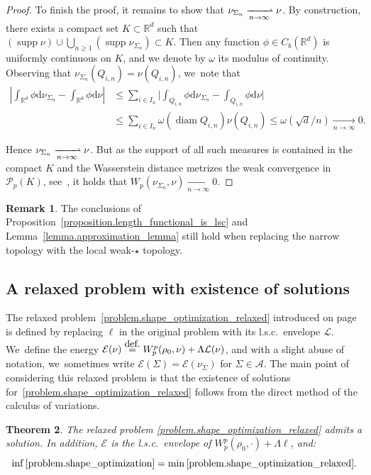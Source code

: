 \documentclass[11pt]{article}
\numberwithin{equation}{section}
\newtheorem{theorem}{Theorem}[section]
\theoremstyle{definition}
\newtheorem{remark}[theorem]{Remark}
\newcommand{\eqdef}{\ensuremath{\stackrel{\mbox{\upshape\tiny def.}}{=}}}
\newcommand\A{\mathcal{A}}
\newcommand\E{\mathcal{E}}
\newcommand{\RR}{\mathbb{R}}
\DeclareMathOperator{\diam}{diam}
\DeclareMathOperator{\supp}{supp}
\newcommand\dd{\mathrm{d}}
\begin{document}
\begin{proof}
To finish the proof, it remains to show that $\nu_{\Sigma_n} \xrightharpoonup[n \to \infty]{} \nu$. By construction, there exists a compact set $K \subset \RR^d$ such that $(\supp \nu)\cup \bigcup_{n\geq 1} \left(\supp \nu_{\Sigma_n}\right) \subset K$. Then any function $\phi \in C_b(\RR^d)$ is uniformly continuous on $K$, and we denote by $\omega$ its modulus of continuity.
Observing that $\nu_{\Sigma_n}(Q_{i,n}) = \nu(Q_{i,n})$, we~note that
\begin{align*}
\left|
\int_{\RR^d}\phi\dd\nu_{\Sigma_n}
-
\int_{\RR^d}\phi\dd\nu
\right|
&\le
\sum_{i \in I_n}
\biggl|
\int_{Q_{i,n}}\phi\dd\nu_{\Sigma_n} - \int_{Q_{i,n}}\phi\dd\nu
\biggr|\\
&\le
\sum_{i \in I_n} \omega(\diam Q_{i,n})\nu(Q_{i,n})
\le
\omega(\sqrt{d}/{n}) \xrightarrow[n \to \infty]{} 0.
\end{align*}

Hence $\nu_{\Sigma_n} \xrightharpoonup[n \to \infty]{} \nu$. But as the support of all such measures is contained in the compact $K$ and the Wasserstein distance metrizes the weak convergence in $\mathcal{P}_p(K)$, see~\cite[Th.\,5.10]{santambrogio2015optimal}, it holds that $W_p(\nu_{\Sigma_n}, \nu) \xrightarrow[n \to \infty]{} 0$.
\end{proof}

\begin{remark}
The conclusions of Proposition~\ref{proposition.length_functional_is_lsc} and Lemma~\ref{lemma.approximation_lemma} still hold when replacing the narrow topology with the local weak-$\star$ topology.
\end{remark}

\subsection{A relaxed problem with existence of solutions}
The relaxed problem~\eqref{problem.shape_optimization_relaxed} introduced on page~\pageref{problem.shape_optimization_relaxed} is defined by replacing $\ell$ in the original problem with its l.s.c.~envelope $\mathcal{L}$. We~define the energy $\E(\nu) \eqdef W_p^p(\rho_0, \nu) + \Lambda \mathcal{L}(\nu)$, and with a slight abuse of notation, we~sometimes write $\mathcal{E}(\Sigma) = \mathcal{E}(\nu_{\Sigma})$ for $\Sigma \in \A$.
The main point of considering this relaxed problem is that the existence of solutions for~\eqref{problem.shape_optimization_relaxed} follows from the direct method of the calculus of variations.

\begin{theorem}\label{theorem.existence_relaxed_problem}
The relaxed problem \eqref{problem.shape_optimization_relaxed} admits a solution. In addition, $\mathcal{E}$ is the l.s.c.~envelope of $W_p^p(\rho_0, \cdot) + \Lambda \ell$, and:
\[
\inf \eqref{problem.shape_optimization} =
\min \eqref{problem.shape_optimization_relaxed}.
\]
\end{theorem}
\end{document}
